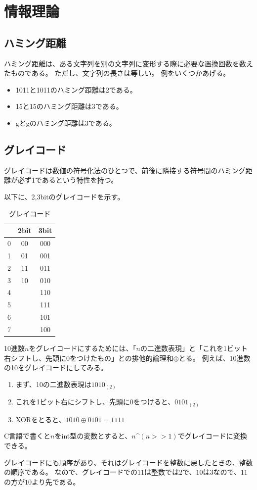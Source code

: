 \chapter{情報理論}

\section{ハミング距離}
ハミング距離は、ある文字列を別の文字列に変形する際に必要な置換回数を数えたものである。
ただし、文字列の長さは等しい。
例をいくつかあげる。
\begin{itemize}
  \item 1011と1011のハミング距離は2である。
  \item 15と15のハミング距離は3である。
  \item {}gとgのハミング距離は3である。
\end{itemize}


\section{グレイコード}
グレイコードは数値の符号化法のひとつで、前後に隣接する符号間のハミング距離が必ず1であるという特性を持つ。

以下に、2,3bitのグレイコードを示す。
\begin{table}[htb]

  \caption{グレイコード }
  \label{table:GrayCode}

  \centering
  \begin{tabular}{c|cc}
      & 2bit & 3bit \\ \hline
    0 &  00  & 000 \\
    1 &  01  & 001 \\
    2 &  11  & 011 \\
    3 &  10  & 010 \\
    4 &      & 110 \\
    5 &      & 111 \\
    6 &      & 101 \\
    7 &      & 100
  \end{tabular}

\end{table}

10進数$n$をグレイコードにするためには、「$n$の二進数表現」と「これを1ビット右シフトし、先頭に0をつけたもの」との排他的論理和$\oplus$とる。
例えば、10進数の10をグレイコードにしてみる。
\begin{enumerate}
  \item まず、10の二進数表現は$1010_{(2)}$
  \item これを1ビット右にシフトし、先頭に0をつけると、$0101_{(2)}$
  \item XORをとると、$1010 \oplus 0101 = 1111$
\end{enumerate}

C言語で書くと$n$をint型の変数とすると、$n\text{\textasciicircum}(n>>1)$でグレイコードに変換できる。

グレイコードにも順序があり、それはグレイコードを整数に戻したときの、整数の順序である。
なので、グレイコードでの$11$は整数では$2$で、$10$は$3$なので、$11$の方が$10$より先である。
